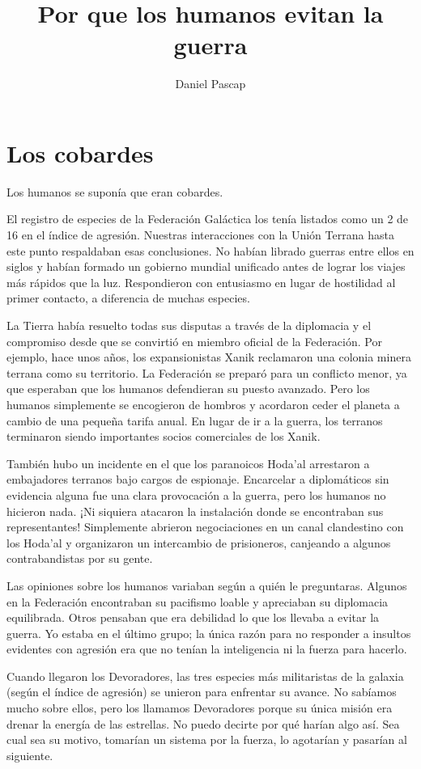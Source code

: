 \documentclass[spanish,12pt,a4paper,oneside,titlepage]{book}
\title{Por que los humanos evitan la guerra}
\author{Daniel Pascap}
\begin{document}
    \maketitle
    \tableofcontents
    \chapter{Los cobardes}
    Los humanos se suponía que eran cobardes.

    El registro de especies de la Federación Galáctica los tenía listados como un 2 de 16 en el índice de agresión. Nuestras interacciones con la Unión Terrana hasta este punto respaldaban esas conclusiones. No habían librado guerras entre ellos en siglos y habían formado un gobierno mundial unificado antes de lograr los viajes más rápidos que la luz. Respondieron con entusiasmo en lugar de hostilidad al primer contacto, a diferencia de muchas especies.

    La Tierra había resuelto todas sus disputas a través de la diplomacia y el compromiso desde que se convirtió en miembro oficial de la Federación. Por ejemplo, hace unos años, los expansionistas Xanik reclamaron una colonia minera terrana como su territorio. La Federación se preparó para un conflicto menor, ya que esperaban que los humanos defendieran su puesto avanzado. Pero los humanos simplemente se encogieron de hombros y acordaron ceder el planeta a cambio de una pequeña tarifa anual. En lugar de ir a la guerra, los terranos terminaron siendo importantes socios comerciales de los Xanik.

    También hubo un incidente en el que los paranoicos Hoda'al arrestaron a embajadores terranos bajo cargos de espionaje. Encarcelar a diplomáticos sin evidencia alguna fue una clara provocación a la guerra, pero los humanos no hicieron nada. ¡Ni siquiera atacaron la instalación donde se encontraban sus representantes! Simplemente abrieron negociaciones en un canal clandestino con los Hoda'al y organizaron un intercambio de prisioneros, canjeando a algunos contrabandistas por su gente.

    Las opiniones sobre los humanos variaban según a quién le preguntaras. Algunos en la Federación encontraban su pacifismo loable y apreciaban su diplomacia equilibrada. Otros pensaban que era debilidad lo que los llevaba a evitar la guerra. Yo estaba en el último grupo; la única razón para no responder a insultos evidentes con agresión era que no tenían la inteligencia ni la fuerza para hacerlo.

    Cuando llegaron los Devoradores, las tres especies más militaristas de la galaxia (según el índice de agresión) se unieron para enfrentar su avance. No sabíamos mucho sobre ellos, pero los llamamos Devoradores porque su única misión era drenar la energía de las estrellas. No puedo decirte por qué harían algo así. Sea cual sea su motivo, tomarían un sistema por la fuerza, lo agotarían y pasarían al siguiente.
\end{document}
